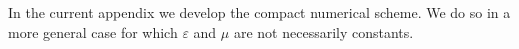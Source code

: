 \documentclass[12pt,reqno]{amsart}
\theoremstyle{definition}
\numberwithin{equation}{section}
\begin{document}

			\section{}\label{appendxib}
			In the current appendix we develop the compact numerical scheme.
			We do so in a more general case  for which $\varepsilon$ and $\mu$ are not necessarily constants.
			 
\end{document}
